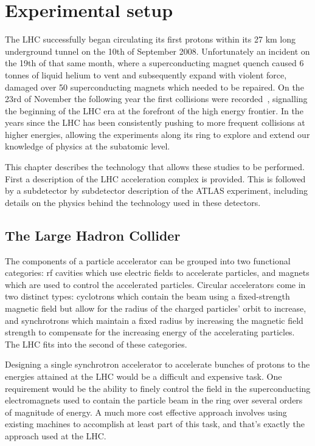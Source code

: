 \chapter{Experimental setup}
\label{Experiment}
The \gls{LHC} successfully began circulating its first protons within its 27 km long underground tunnel on the 10th of September 2008.  
Unfortunately an incident on the 19th of that same month, where a superconducting magnet quench caused 6 tonnes of liquid helium to vent and subsequently expand with violent force, damaged over 50 superconducting magnets which needed to be repaired.   
On the 23rd of November the following year the first collisions were recorded~\cite{FirstCollisions}, signalling the beginning of the LHC era at the forefront of the high energy frontier.  
In the years since the LHC has been consistently pushing to more frequent collisions at higher energies, allowing the experiments along its ring to explore and extend our knowledge of physics at the subatomic level.  

This chapter describes the technology that allows these studies to be performed.  
First a description of the LHC acceleration complex is provided.  
This is followed by a subdetector by subdetector description of the ATLAS experiment, including details on the physics behind the technology used in these detectors.  

\section{The Large Hadron Collider}
\label{Sec:LHC}

The components of a particle accelerator can be grouped into two functional categories: rf cavities which use electric fields to accelerate particles, and magnets which are used to control the accelerated particles.  
Circular accelerators come in two distinct types: cyclotrons which contain the beam using a fixed-strength magnetic field but allow for the radius of the charged particles' orbit to increase, and synchrotrons which maintain a fixed radius by increasing the magnetic field strength to compensate for the increasing energy of the accelerating particles.  
The LHC fits into the second of these categories.  

Designing a single synchrotron accelerator to accelerate bunches of protons to the energies attained at the LHC would be a difficult and expensive task.
One requirement would be the ability to finely control the field in the superconducting electromagnets used to contain the particle beam in the ring over several orders of magnitude of energy.  
A much more cost effective approach involves using existing machines to accomplish at least part of this task, and that's exactly the approach used at the LHC.  

